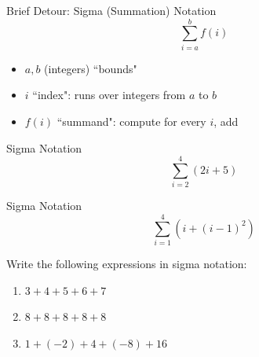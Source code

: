 \begin{frame}{Brief Detour: Sigma (Summation) Notation}
\[\sum_{i=a}^b f(i)\]\pause
\begin{itemize}[<+->]
\item $a,b$ (integers) ``bounds"
\item $i$ ``index": runs over integers from $a$ to $b$
\item $f(i)$ ``summand": compute for every $i$, add
\end{itemize}

\end{frame}
\begin{frame}[t]{Sigma Notation}
\AnswerSpace
{}
\[\sum_{i=2}^4 (2i+5)\]\pause

\end{frame}
\begin{frame}[t]{Sigma Notation}
\AnswerSpace
{}
\[\sum_{i=1}^4 (i+(i-1)^2)\]

\pause
{}
\end{frame}
\begin{frame}[t]
\AnswerNo
{}
Write the following expressions in sigma notation:
\begin{enumerate}
\item $3+4+5+6+7$
\item $8+8+8+8+8$
\item $1+(-2)+4+(-8)+16$
\end{enumerate}
\end{frame}

